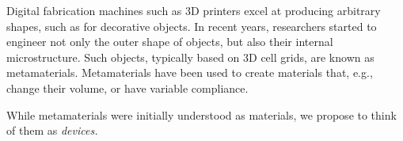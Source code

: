 





Digital fabrication machines such as 3D printers excel at producing arbitrary shapes, such as for decorative objects. In recent years, researchers started to engineer not only the outer shape of objects, but also their internal microstructure. Such objects, typically based on 3D cell grids, are known as metamaterials. Metamaterials have been used to create materials that, e.g., change their volume, or have variable compliance. 

While metamaterials were initially understood as materials, we propose to think of them as \textit{devices.}

